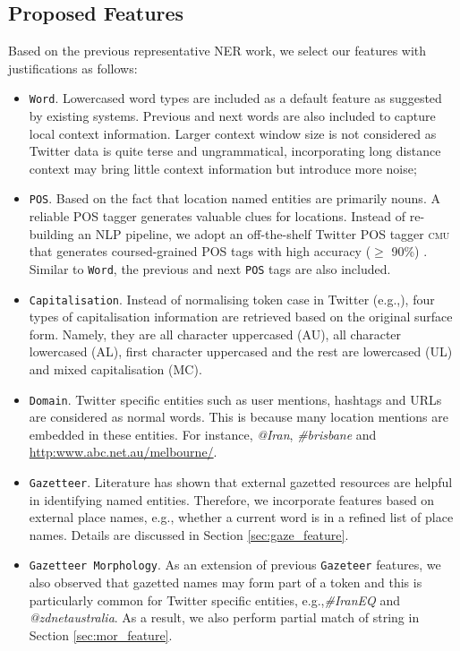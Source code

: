 \documentclass[11pt]{article}
\newcommand{\eg}{e.g.,\xspace}
\newcommand{\myex}[1]{\textit{#1}}
\newcommand{\cmu}{\textsc{cmu}\xspace}
\newcommand{\feature}[1]{\texttt{#1}\xspace}
\newcommand{\myurl}[1]{{\footnotesize\url{#1}}}
\newcommand{\secref}[2][]{Section#1 \ref{#2}}
\begin{document}
\subsection{Proposed Features}
\label{sec:basic_feature}

Based on the previous representative NER work, we select our features with justifications as follows:
\begin{itemize}
    \item \feature{Word}. Lowercased word types are included as a default feature as suggested by existing systems. Previous and next words are also included to capture local context information. Larger context window size is not considered as Twitter data is quite terse and ungrammatical, incorporating long distance context may bring little context information but introduce more noise;
    \item \feature{POS}. Based on the fact that location named entities are primarily nouns. A reliable POS tagger generates valuable clues for locations. Instead of re-building an NLP pipeline, we adopt an off-the-shelf Twitter POS tagger \cmu that generates coursed-grained POS tags with high accuracy ($\ge$ 90\%) \cite{naacl13owop}. Similar to \feature{Word}, the previous and next \feature{POS} tags are also included.
    \item \feature{Capitalisation}. Instead of normalising token case in Twitter (\eg \cite{emnlp11ritt}), four types of capitalisation information are retrieved based on the original surface form. Namely, they are all character uppercased (AU), all character lowercased (AL), first character uppercased and the rest are lowercased (UL) and mixed capitalisation (MC). 
    \item \feature{Domain}. Twitter specific entities such as user mentions, hashtags and URLs are considered as normal words. This is because many location mentions are embedded in these entities. For instance, \myex{@Iran}, \myex{\#brisbane} and \myurl{http:www.abc.net.au/melbourne/}.
    \item \feature{Gazetteer}. Literature has shown that external gazetted resources are helpful in identifying named entities. Therefore, we incorporate features based on external place names, \eg whether a current word is in a refined list of place names. Details are discussed in \secref{sec:gaze_feature}.
    \item \feature{Gazetteer Morphology}. As an extension of previous \feature{Gazeteer} features, we also observed that gazetted names may form part of a token and this is particularly common for Twitter specific entities, \eg \myex{\#IranEQ} and \myex{@zdnetaustralia}. As a result, we also perform partial match of string in \secref{sec:mor_feature}.
\end{itemize}
\end{document}
